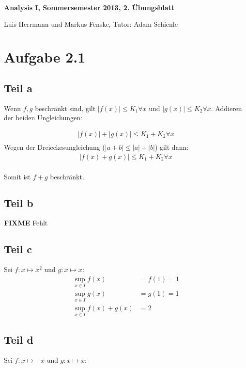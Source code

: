 \documentclass[a4paper,german,12pt,smallheadings]{scrartcl}
\begin{document}
\begin{center}
\bfseries %
\sffamily %
\vspace{-40pt}
Analysis I, Sommersemester 2013, 2. Übungsblatt

Luis Herrmann und Markus Fenske, Tutor: Adam Schienle
\vspace{-10pt}
\end{center}

\section*{Aufgabe 2.1}
\subsection*{Teil a}
Wenn $f, g$ beschränkt sind, gilt $|f(x)| \le K_1 \forall x$ und $|g(x)| \le K_2
\forall x$. Addieren der beiden Ungleichungen:

\begin{align*}
  |f(x)| + |g(x)| \le K_1 + K_2 \forall x \\
\end{align*}
Wegen der Dreieckesungleichung ($|a + b| \le |a| + |b|$) gilt dann:
\begin{align*}
  |f(x) + g(x)| \le K_1 + K_2 \forall x \\
\end{align*}

Somit ist $f + g$ beschränkt.
\subsection*{Teil b}
\textbf{FIXME} Fehlt %

\subsection*{Teil c}
Sei $f: x \mapsto x^2$ und $g: x \mapsto x$:
\begin{align*}
  \sup_{x \in I} f(x) &= f(1) = 1 \\
  \sup_{x \in I} g(x) &= g(1) = 1 \\
  \sup_{x \in I} f(x) + g(x) &= 2
\end{align*}

\subsection*{Teil d}
Sei $f: x \mapsto -x$ und $g: x \mapsto x$:
\end{document}
